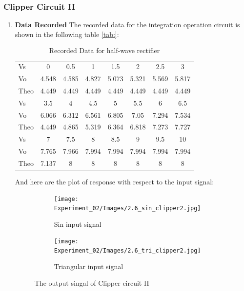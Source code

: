     \subsubsection{Clipper Circuit II}
    \begin{enumerate}[I]
        \item \textbf{Data Recorded}\newline
            The recorded data for the integration operation circuit is shown in the following table \ref{tab:}:
            \begin{table}[H]
                \centering
                \begin{tabular}{l|ccccccc}
                    \toprule
                    Vs   & 0     & 0.5   & 1     & 1.5   & 2     & 2.5   & 3     \\
                    Vo   & 4.548 & 4.585 & 4.827 & 5.073 & 5.321 & 5.569 & 5.817 \\
                    Theo & 4.449 & 4.449 & 4.449 & 4.449 & 4.449 & 4.449 & 4.449 \\
                    \midrule
                    \midrule
                    Vs   & 3.5   & 4     & 4.5   & 5     & 5.5   & 6     & 6.5   \\
                    Vo   & 6.066 & 6.312 & 6.561 & 6.805 & 7.05  & 7.294 & 7.534 \\
                    Theo & 4.449 & 4.865 & 5.319 & 6.364 & 6.818 & 7.273 & 7.727 \\
                    \midrule
                    \midrule
                    Vs   & 7     & 7.5   & 8     & 8.5   & 9     & 9.5   & 10    \\
                    Vo   & 7.765 & 7.966 & 7.994 & 7.994 & 7.994 & 7.994 & 7.994 \\
                    Theo & 7.137 & 8     & 8     & 8     & 8     & 8     & 8     \\
                    \midrule
                \end{tabular}
                    \caption{Recorded Data for half-wave rectifier}
                \label{tab:2clip2}
            \end{table}
        And here are the plot of response with respect to the input signal:
        \begin{figure}[H]
            \centering
            \begin{subfigure}{0.45\textwidth}
                \texttt{[image: Experiment\_02/Images/2.6\_sin\_clipper2.jpg]}
                \caption{Sin input signal}
                \label{wave:2cSin}
            \end{subfigure}
            \begin{subfigure}{0.45\textwidth}
                \texttt{[image: Experiment\_02/Images/2.6\_tri\_clipper2.jpg]}
                \caption{Triangular input signal}
                \label{wave:2cTri}
            \end{subfigure}
            \caption{The output singal of Clipper circuit II}
        \end{figure}
        

\end{enumerate}
